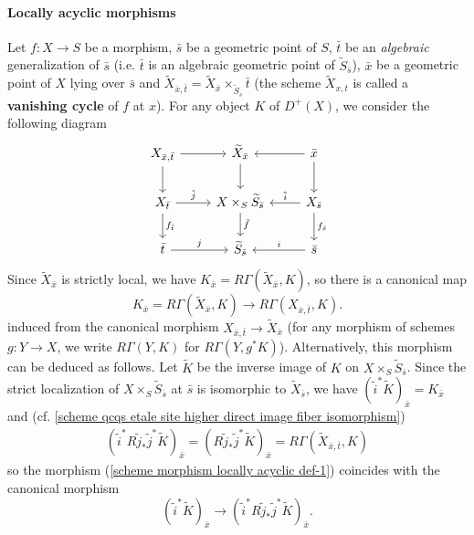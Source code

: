 \paragraph{Locally acyclic morphisms}
Let $f:X\to S$ be a morphism, $\bar{s}$ be a geometric point of $S$, $\bar{t}$ be an \textit{algebraic} generalization of $\bar{s}$ (i.e. $\bar{t}$ is an algebraic geometric point of $\widetilde{S}_{\bar{s}}$), $\bar{x}$ be a geometric point of $X$ lying over $\bar{s}$ and $\widetilde{X}_{\bar{x},\bar{t}}=\widetilde{X}_{\bar{x}}\times_{\widetilde{S}_s}\bar{t}$ (the scheme $\widetilde{X}_{x,t}$ is called a \textbf{vanishing cycle} of $f$ at $x$). For any object $K$ of $D^+(X)$, we consider the following diagram
\[\begin{tikzcd}
X_{\bar{x},\bar{t}}\ar[r]\ar[d]&\widetilde{X}_{\bar{x}}\ar[d]&\bar{x}\ar[d]\ar[l]\\
X_{\bar{t}}\ar[r,"\tilde{j}"]\ar[d,"f_{\bar{t}}"]&X\times_S\widetilde{S}_{\bar{s}}\ar[d,"\tilde{f}"]&X_{\bar{s}}\ar[d,"f_{\bar{s}}"]\ar[l,swap,"\tilde{i}"]\\
\bar{t}\ar[r,"j"]&\widetilde{S}_{\bar{s}}&\bar{s}\ar[l,swap,"i"]
\end{tikzcd}\]
Since $\widetilde{X}_{\bar{x}}$ is strictly local, we have $K_{\bar{x}}=R\Gamma(\widetilde{X}_{\bar{x}},K)$, so there is a canonical map
\begin{equation}\label{scheme morphism locally acyclic def-1}
K_{\bar{x}}=R\Gamma(\widetilde{X}_{\bar{x}},K)\to R\Gamma(X_{\bar{x},\bar{t}},K).
\end{equation}
induced from the canonical morphism $X_{\bar{x},\bar{t}}\to\widetilde{X}_{\bar{x}}$ (for any morphism of schemes $g:Y\to X$, we write $R\Gamma(Y,K)$ for $R\Gamma(Y,g^*K)$). Alternatively, this morphism can be deduced as follows. Let $\widetilde{K}$ be the inverse image of $K$ on $X\times_S\widetilde{S}_{\bar{s}}$. Since the strict localization of $X\times_S\widetilde{S}_{\bar{s}}$ at $\bar{s}$ is isomorphic to $\widetilde{X}_{\bar{s}}$, we have $(\tilde{i}^*\widetilde{K})_{\bar{x}}=K_{\bar{x}}$ and (cf. \cref{scheme qcqs etale site higher direct image fiber isomorphism})
\begin{align*}
(\tilde{i}^*R\tilde{j}_*\tilde{j}^*\widetilde{K})_{\bar{x}}=(R\tilde{j}_*\tilde{j}^*\widetilde{K})_{\bar{x}}=R\Gamma(\widetilde{X}_{\bar{x},\bar{t}},K)
\end{align*}
so the morphism (\ref{scheme morphism locally acyclic def-1}) coincides with the canonical morphism
\[(\tilde{i}^*\widetilde{K})_{\bar{x}}\to(\tilde{i}^*R\tilde{j}_*\tilde{j}^*\widetilde{K})_{\bar{x}}.\]

